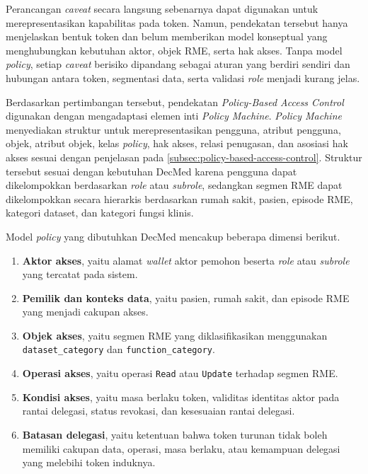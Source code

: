 \documentclass[bahasa, 12pt, a4paper, onecolumn, oneside, final]{report}
\begin{document}
Perancangan \textit{caveat} secara langsung sebenarnya dapat digunakan untuk merepresentasikan kapabilitas pada token. Namun, pendekatan tersebut hanya menjelaskan bentuk token dan belum memberikan model konseptual yang menghubungkan kebutuhan aktor, objek RME, serta hak akses. Tanpa model \textit{policy}, setiap \textit{caveat} berisiko dipandang sebagai aturan yang berdiri sendiri dan hubungan antara token, segmentasi data, serta validasi \textit{role} menjadi kurang jelas.

Berdasarkan pertimbangan tersebut, pendekatan \textit{Policy-Based Access Control} digunakan dengan mengadaptasi elemen inti \textit{Policy Machine}. \textit{Policy Machine} menyediakan struktur untuk merepresentasikan pengguna, atribut pengguna, objek, atribut objek, kelas \textit{policy}, hak akses, relasi penugasan, dan asosiasi hak akses sesuai dengan penjelasan pada \ref{subsec:policy-based-access-control}. Struktur tersebut sesuai dengan kebutuhan DecMed karena pengguna dapat dikelompokkan berdasarkan \textit{role} atau \textit{subrole}, sedangkan segmen RME dapat dikelompokkan secara hierarkis berdasarkan rumah sakit, pasien, episode RME, kategori dataset, dan kategori fungsi klinis.

Model \textit{policy} yang dibutuhkan DecMed mencakup beberapa dimensi berikut.

\begin{enumerate}
	\item \textbf{Aktor akses}, yaitu alamat \textit{wallet} aktor pemohon beserta \textit{role} atau \textit{subrole} yang tercatat pada sistem.

	\item \textbf{Pemilik dan konteks data}, yaitu pasien, rumah sakit, dan episode RME yang menjadi cakupan akses.

	\item \textbf{Objek akses}, yaitu segmen RME yang diklasifikasikan menggunakan \texttt{dataset\_category} dan \texttt{function\_category}.

	\item \textbf{Operasi akses}, yaitu operasi \texttt{Read} atau \texttt{Update} terhadap segmen RME.

	\item \textbf{Kondisi akses}, yaitu masa berlaku token, validitas identitas aktor pada rantai delegasi, status revokasi, dan kesesuaian rantai delegasi.

	\item \textbf{Batasan delegasi}, yaitu ketentuan bahwa token turunan tidak boleh memiliki cakupan data, operasi, masa berlaku, atau kemampuan delegasi yang melebihi token induknya.

\end{enumerate}
\end{document}
